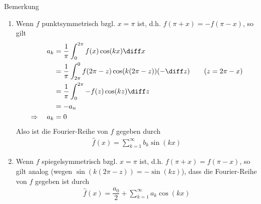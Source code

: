 \begin{colboxBreakable}{Bemerkung}
  \begin{enumerate}
    \item 
    Wenn $f$ punktsymmetrisch bzgl. $x=\pi$ ist, d.h. $f(\pi+x) = -f(\pi-x)$, so gilt 
    \begin{align*}
      a_k &= \frac{1}{\pi} \int_0^{2\pi} f(x) \cos(kx)  \diff x \\
      &= \frac{1}{\pi} \int_{2\pi}^{0} f(2\pi - z) \cos(k(2\pi - z))  (-\diff z) \qquad (z = 2\pi - x) \\
      &= \frac{1}{\pi} \int_0^{2\pi} -f(z) \cos(kz)  \diff z \\
      &= -a_n \\
      \Rightarrow \quad a_k &= 0
    \end{align*}
    Also ist die Fourier-Reihe von $f$ gegeben durch 
    \begin{align*}
      \hat{f}(x) = \sum_{k=1}^{\infty} b_k\sin(kx)
    \end{align*}
    \item Wenn $f$ spiegelsymmetrisch bzgl. $x=\pi$ ist, d.h. $f(\pi+x)=f(\pi-x)$, so gilt analog 
    (wegen $\sin(k(2\pi-z))=-\sin(kz)$), dass die Fourier-Reihe von $f$ gegeben ist durch 
    \begin{align*}
      \hat{f}(x) = \dfrac{a_0}{2} + \sum_{k=1}^{\infty} a_k\cos(kx)
    \end{align*}
  \end{enumerate}
\end{colboxBreakable}

